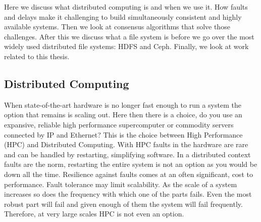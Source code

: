Here we discuss what distributed computing is and when we use it. How faults and delays make it challenging to build simultaneously consistent and highly available systems. Then we look at consensus algorithms that solve those challenges. After this we discuss what a file system is before we go over the most widely used distributed file systems: HDFS and Ceph. Finally, we look at work related to this thesis.

\subsection{Distributed Computing}
When state-of-the-art hardware is no longer fast enough to run a system the option that remains is scaling out. Here then there is a choice, do you use an expansive, reliable high performance supercomputer or commodity servers connected by IP and Ethernet? This is the choice between High Performance (HPC) and Distributed Computing. With HPC faults in the hardware are rare and can be handled by restarting, simplifying software. In a distributed context faults are the norm, restarting the entire system is not an option as you would be down all the time. Resilience against faults comes at an often significant, cost to performance. Fault tolerance may limit scalability. As the scale of a system increases so does the frequency with which one of the parts fails. Even the most robust part will fail and given enough of them the system will fail frequently. Therefore, at very large scales HPC is not even an option. 
